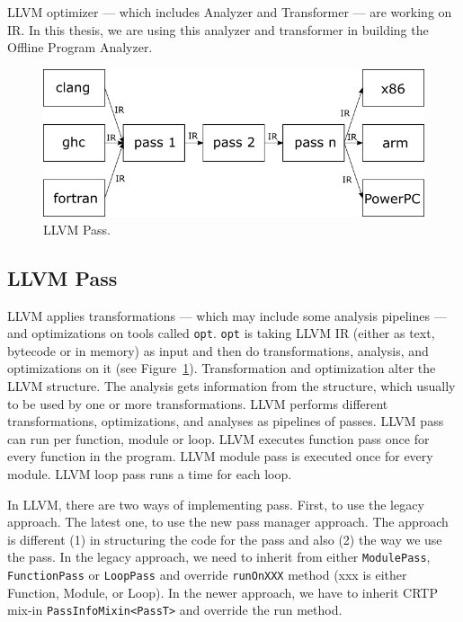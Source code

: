 LLVM optimizer --- which includes Analyzer and Transformer --- are working on
IR. In this thesis, we are using this analyzer and transformer in building the
Offline Program Analyzer.

\begin{figure}[htbp] 
    \centerline{\includegraphics[scale=.75]{Figures/03/llvm-overview.png}} 
    \caption{LLVM Pass.} 
    \label{fig:llvm} 
\end{figure} 

\subsection{LLVM Pass}

LLVM applies transformations --- which may include some analysis pipelines ---
and optimizations on tools called \texttt{opt}. \texttt{opt} is taking LLVM IR
(either as text, bytecode or in memory) as input and then do transformations,
analysis, and optimizations on it (see Figure~\ref{fig:llvm}). Transformation
and optimization alter the LLVM structure. The analysis gets information from
the structure, which usually to be used by one or more transformations. LLVM
performs different transformations, optimizations, and analyses as pipelines of
passes. LLVM pass can run per function, module or loop. LLVM executes function
pass once for every function in the program. LLVM module pass is executed once
for every module. LLVM loop pass runs a time for each loop.  


In LLVM, there are two ways of implementing pass. First, to use the legacy
approach. The latest one, to use the new pass manager approach. The approach is
different (1) in structuring the code for the pass and also (2) the way we use
the pass. In the legacy approach, we need to inherit from either
\texttt{ModulePass}, \texttt{FunctionPass} or \texttt{LoopPass} and override
\texttt{runOnXXX} method (xxx is either Function, Module, or Loop). In the newer
approach, we have to inherit CRTP mix-in \texttt{PassInfoMixin<PassT>} and
override the run method.

